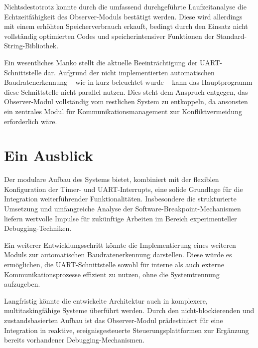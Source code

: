 Nichtsdestotrotz konnte durch die umfassend durchgef\"uhrte Laufzeitanalyse die Echtzeitf\"ahigkeit des Observer-Moduls best\"atigt werden. Diese wird allerdings mit einem erh\"ohten Speicherverbrauch erkauft, bedingt durch den Einsatz nicht vollst\"andig optimierten Codes und speicherintensiver Funktionen der Standard-String-Bibliothek.

\newpage
Ein wesentliches Manko stellt die aktuelle Beeintr\"achtigung der UART-Schnittstelle dar. Aufgrund der nicht implementierten automatischen Baudratenerkennung -- wie in  kurz beleuchtet wurde -- kann das Hauptprogramm diese Schnittstelle nicht parallel nutzen. Dies steht dem Anspruch entgegen, das Observer-Modul vollst\"andig vom restlichen System zu entkoppeln, da ansonsten ein zentrales Modul f\"ur Kommunikationsmanagement zur Konfliktvermeidung erforderlich w\"are.\AI


\section{Ein Ausblick}
\label{sec:EinAusblick}

Der modulare Aufbau des Systems bietet, kombiniert mit der flexiblen Konfiguration der Timer- und UART-Interrupts, eine solide Grundlage f\"ur die Integration weiterf\"uhrender Funktionalit\"aten. Insbesondere die strukturierte Umsetzung und umfangreiche Analyse der Software-Breakpoint-Mechanismen liefern wertvolle Impulse f\"ur zuk\"unftige Arbeiten im Bereich experimenteller Debugging-Techniken.

Ein weiterer Entwicklungsschritt k\"onnte die Implementierung eines weiteren Moduls zur automatischen Baudratenerkennung darstellen. Diese w\"urde es erm\"oglichen, die UART-Schnittstelle sowohl f\"ur interne als auch externe Kommunikationsprozesse effizient zu nutzen, ohne die Systemtrennung aufzugeben.

Langfristig k\"onnte die entwickelte Architektur auch in komplexere, multitaskingf\"ahige Systeme \"uberf\"uhrt werden. Durch den nicht-blockierenden und zustandsbasierten Aufbau ist das Observer-Modul pr\"adestiniert f\"ur eine Integration in reaktive, ereignisgesteuerte Steuerungsplattformen zur Erg\"anzung bereits vorhandener Debugging-Mechanismen.